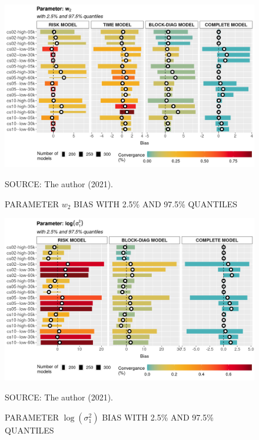 \documentclass[12pt, %
               openright, %
               oneside, %
               a4paper, %
               chapter=TITLE, %
               section=TITLE, %
               brazil,
               english %
]{abntex2}
\begin{document}
\begin{apendicesenv}
\begin{figure}[H]
 \setlength{\abovecaptionskip}{.0001pt}
 \caption{PARAMETER \(w_{2}\) BIAS WITH 2.5\% AND 97.5\% QUANTILES}
 \vspace{0.2cm}\centering
 \includegraphics[width=\textwidth]{bias2plot-6.png}\\
 \begin{footnotesize}
  SOURCE: The author (2021).
 \end{footnotesize}
 \label{fig:biasw2}
\end{figure}

\begin{figure}[H]
 \setlength{\abovecaptionskip}{.0001pt}
 \caption{PARAMETER \(\log(\sigma_{1}^{2})\) BIAS WITH 2.5\% AND 97.5\%
          QUANTILES}
 \vspace{0.2cm}\centering
 \includegraphics[width=\textwidth]{bias2plot-7.png}\\
 \begin{footnotesize}
  SOURCE: The author (2021).
 \end{footnotesize}
 \label{fig:biaslogs2_1}
\end{figure}


\end{apendicesenv}
\end{document}
